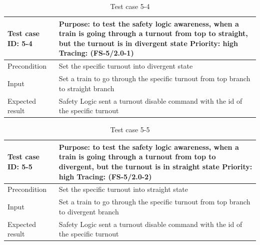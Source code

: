 \begin{table}[H]
	\caption{Test case 5-4}
	\label{table:TCase-FS5-4}
	\begin{center}
		\renewcommand{\arraystretch}{1.8}
		\begin{tabu} 
			to 0.9 \textwidth
			{  X[0.4, c] X[c] }
			\toprule
			Test case ID: 5-4 & Purpose: to test the safety logic awareness, when a train is going through a turnout from top to straight, but the turnout is in divergent state \newline Priority: high \newline Tracing: (FS-5/2.0-1)\\ \midrule
			Precondition & Set the specific turnout into divergent state  \\
			Input & Set a train to go through the specific turnout from top branch to straight branch \\
			Expected result & Safety Logic sent a turnout disable command with the id of the specific turnout \\ \bottomrule
		\end{tabu}
	\end{center}
\end{table} 



\begin{table}[H]
	\caption{Test case 5-5}
	\label{table:TCase-FS5-5}
	\begin{center}
		\renewcommand{\arraystretch}{1.8}
		\begin{tabu} 
			to 0.9 \textwidth
			{  X[0.4, c] X[c] }
			\toprule
			Test case ID: 5-5 & Purpose: to test the safety logic awareness, when a train is going through a turnout from top to divergent, but the turnout is in straight state \newline Priority: high \newline Tracing: (FS-5/2.0-2)\\ \midrule
			Precondition & Set the specific turnout into straight state  \\
			Input & Set a train to go through the specific turnout from top branch to divergent branch \\
			Expected result & Safety Logic sent a turnout disable command with the id of the specific turnout \\ \bottomrule
		\end{tabu}
	\end{center}
\end{table} 



